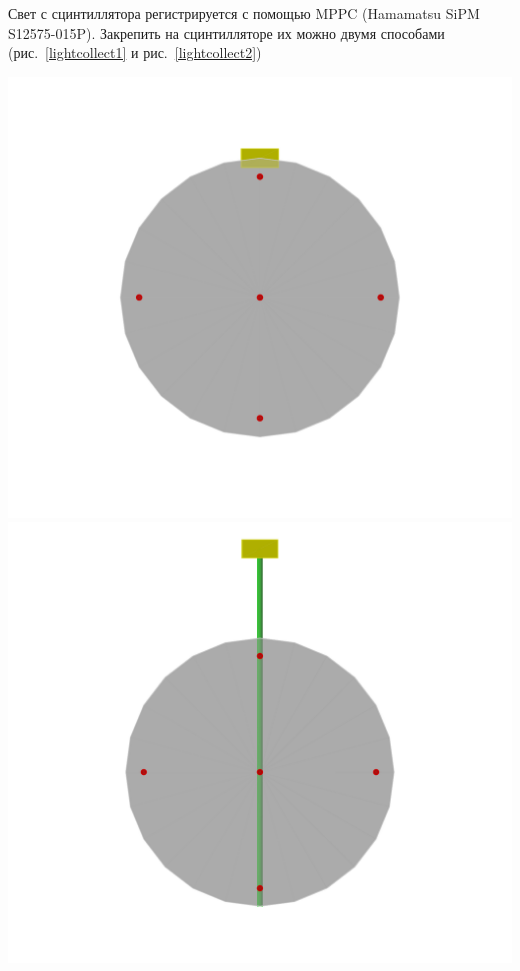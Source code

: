 \documentclass[a1paper,portrait, fontscale=0.575]{baposter}
\begin{document}
\begin{poster}
{            Свет с сцинтиллятора регистрируется с помощью MPPC (Hamamatsu SiPM S12575-015P). Закрепить на сцинтилляторе их можно двумя способами (рис.~\ref{lightcollect1} и рис.~\ref{lightcollect2}) 
            \begin{multicols}{2}
                \begin{center}
                    \includegraphics[width=0.9\linewidth]{light_2.pdf}
                    \label{lightcollect1}
                    \includegraphics[width=0.9\linewidth]{light_1.pdf}
                    \label{lightcollect2}
                    

\end{center}
\end{multicols}}
\end{poster}
\end{document}
